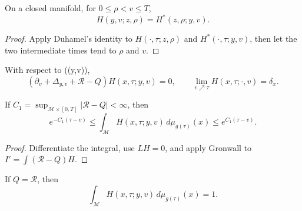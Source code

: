 \begin{lemma}
\label{lem:chow-iii-heat-adjoint-kernel-symmetry-closed}


On a closed manifold, for \(0\le \rho<v\le T\),
\[
 H(y,v;z,\rho)=H^*(z,\rho;y,v).
\]
\end{lemma}
\begin{proof}
\sketch Apply Duhamel's identity to \(H(\cdot,\tau;z,\rho)\) and
\(H^*(\cdot,\tau;y,v)\), then let the two intermediate times tend to
\(\rho\) and \(v\).
\end{proof}

\begin{lemma}
\label{lem:chow-iii-heat-kernel-second-variables-adjoint}


With respect to ((y,v)),
\[
 (\partial_v+\Delta_{y,v}+\mathcal R-Q)H(x,\tau;y,v)=0,
 \qquad \lim_{v\nearrow\tau}H(x,\tau;\cdot,v)=\delta_x.
\]
\end{lemma}

\begin{lemma}
\label{lem:chow-iii-closed-heat-kernel-mass-bound}


If \(C_1=\sup_{\mathcal M\times[0,T]}|\mathcal R-Q|<\infty\), then
\[
 e^{-C_1(\tau-v)}\le
 \int_{\mathcal M}H(x,\tau;y,v)\,d\mu_{g(\tau)}(x)
 \le e^{C_1(\tau-v)}.
\]
\end{lemma}
\begin{proof}
\sketch Differentiate the integral, use \(LH=0\), and apply Gronwall to
\(I'=\int(\mathcal R-Q)H\).
\end{proof}

\begin{corollary}[Mass preservation when \(Q=\mathcal R\)]
\label{cor:chow-iii-closed-heat-kernel-mass-preservation}


If \(Q=\mathcal R\), then
\[
 \int_{\mathcal M}H(x,\tau;y,v)\,d\mu_{g(\tau)}(x)=1.
\]
\end{corollary}

